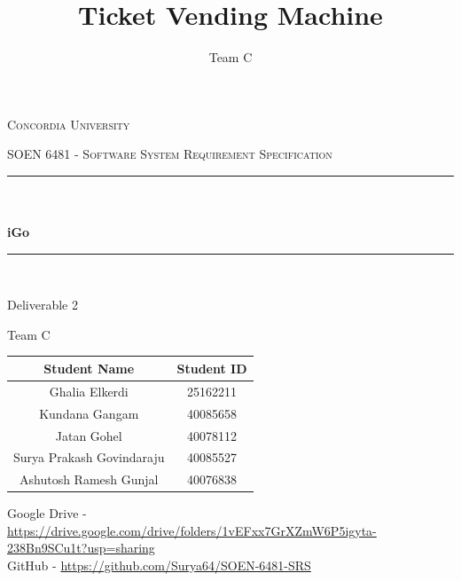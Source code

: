 \documentclass[12pt]{report}
\title{Ticket Vending Machine}
\author{Team C}
\date{}
\makeatletter
\let\thetitle\@title
\makeatother
\begin{document}
\begin{titlepage}
	\centering
    \vspace*{0.5 cm}
\begin{center}    \textsc{\Large Concordia University}\\[2.0 cm]	\end{center}
	\textsc{\Large  SOEN 6481 - Software System Requirement Specification}\\[0.5 cm]
	\rule{\linewidth}{0.2 mm} \\[0.4 cm]
	{ \huge \thetitle}\\[0.2 cm]
	{ \huge \textbf{iGo}}
	\rule{\linewidth}{0.2 mm} \\[1.5 cm]

\begin{center}   {\Large Deliverable  2}\\[1.0 cm]
\end{center}	
\begin{center}  {\large Team C }\\[0.5 cm]
 
\begin{table}[h]
\centering
\begin{tabular}{|c|c|}
\hline
\textbf{Student Name}     & \textbf{Student ID} \\ \hline
Ghalia Elkerdi            & 25162211            \\ \hline
Kundana Gangam            & 40085658            \\ \hline
Jatan Gohel               & 40078112            \\ \hline
Surya Prakash Govindaraju & 40085527            \\ \hline
Ashutosh Ramesh Gunjal    & 40076838            \\ \hline
\end{tabular}
\end{table}

            {\large Google Drive -  \url{https://drive.google.com/drive/folders/1vEFxx7GrXZmW6P5igyta-238Bn9SCu1t?usp=sharing}}\\[0.5 cm]
            {\large GitHub - \url{https://github.com/Surya64/SOEN-6481-SRS}}
\end{center}
	
\end{titlepage}

\tableofcontents

\pagebreak

\renewcommand{\thesection}{\arabic{section}}
\end{document}

